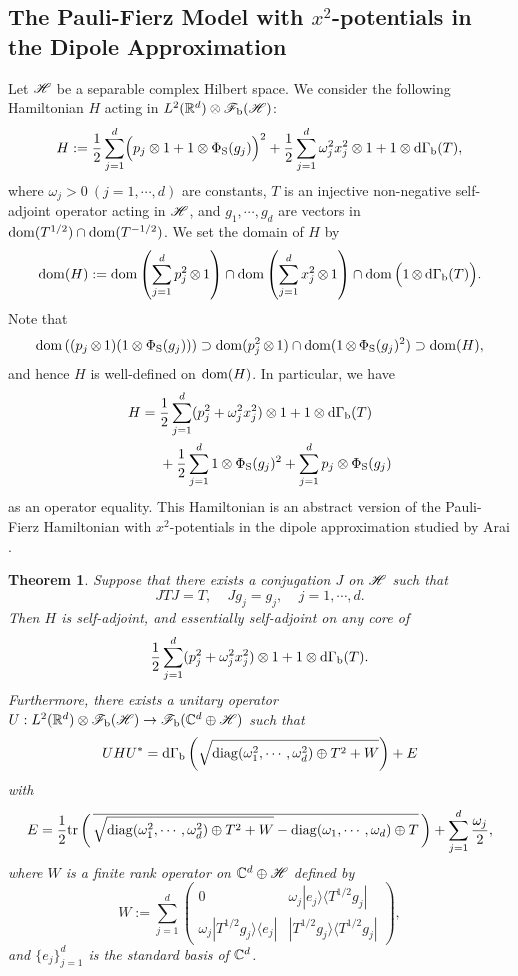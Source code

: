 \documentclass[12pt]{article}
\theoremstyle{plain}
\newtheorem{theorem}{Theorem}[section]
\numberwithin{equation}{section}
\theoremstyle{remark}
\begin{document}
\subsection{The Pauli-Fierz Model with $x^2$-potentials in the Dipole Approximation}\label{PFmodel}
Let $\mathscr{H}$ be a separable complex Hilbert space.
We consider the following Hamiltonian $H$ acting in $L^2(\mathbb{R}^d)\otimes\mathscr{F}_\mathrm{b}(\mathscr{H})$:
\[
H:=\frac{1}{2}\sum_{j=1}^{d}\Bigl(p_j\otimes 1+1\otimes\Phi_{\rm S}(g_j)\Bigr)^2 
+\frac{1}{2}\sum_{j=1}^d \omega_j^2x_j^2\otimes 1 +1\otimes\mathrm{d\Gamma_b}(T),
\]
where $\omega_j>0\ (j=1,\cdots, d)$ are constants, $T$ is an injective non-negative self-adjoint operator acting in $\mathscr{H}$,
and $g_1,\cdots,g_d$ are vectors in ${\rm dom}(T^{1/2})\cap{\rm dom}(T^{-1/2})$.
We set the domain of $H$ by
\begin{align}
 \mathop{\mathrm{dom}}(H) 
 := \mathop{\mathrm{dom}}\left(\sum_{j=1}^d p_j^2\mathop{\otimes}1\right) 
  \cap \mathop{\mathrm{dom}}\left(\sum_{j=1}^d x_j^2\mathop{\otimes} 1\right)
  \cap \mathop{\mathrm{dom}}\Big( 1\mathop{\otimes} \mathrm{d\Gamma_b}(T)\Big).  \label{dom of Hpf}
\end{align}
Note that
\begin{align*}
  \mathop{\mathrm{dom}}\left((p_j\mathop{\otimes} 1)(1\otimes \Phi_\mathrm{S}(g_j))\right) \supset \mathop{\mathrm{dom}}(p_j^2\mathop{\otimes}1)\cap\mathop{\mathrm{dom}}(1\mathop{\otimes}\Phi_\mathrm{S}(g_j)^2) \supset \mathop{\mathrm{dom}}(H),
\end{align*}
and hence $H$ is well-defined on $\mathop{\mathrm{dom}}(H)$.
In particular, we have
\begin{align}
H &= \frac{1}{2}\sum_{j=1}^d(p_j^2+\omega_j^2x_j^2)\otimes 1 + 1\otimes\mathrm{d\Gamma_b}(T)\notag\\
&~~~~+ \frac{1}{2}\sum_{j=1}^d1\otimes\Phi_\mathrm{S}(g_j)^2 + \sum_{j=1}^dp_j\otimes\Phi_\mathrm{S}(g_j)\label{gpfh}
\end{align}
as an operator equality.
This Hamiltonian is an abstract version of the Pauli-Fierz Hamiltonian with $x^2$-potentials in the dipole approximation studied by Arai \cite{A83}.

\begin{theorem}
Suppose that there exists a conjugation $J$ on $\mathscr{H}$ such that 
\[
JTJ=T,\ \ \ \ \ Jg_j=g_j,\ \ \ \ \ j=1,\cdots,d.
\]
Then $H$ is self-adjoint, and essentially self-adjoint on any core of
\[
\frac{1}{2}\sum_{j=1}^d(p_j^2+\omega_j^2x_j^2)\otimes 1 + 1\otimes\mathrm{d\Gamma_b}(T).
\]
Furthermore, there exists a unitary operator $U:L^2(\mathbb{R}^d)\otimes\mathscr{F}_\mathrm{b}(\mathscr{H})\to\mathscr{F}_\mathrm{b}(\mathbb{C}^d\oplus\mathscr{H})$ such that 
\[
UHU^*=\mathrm{d\Gamma_b}\left(\sqrt{{\rm diag}(\omega_1^2,\cdots,\omega_d^2)\oplus T^2 + W}\right)
+E
\]
with
\[
E=\frac{1}{2}\mathrm{tr}\left(\,\overline{\sqrt{{\rm diag}(\omega_1^2,\cdots,\omega_d^2)\oplus T^2 + W}-{\rm diag}(\omega_1,\cdots,\omega_d)\oplus T}\,\right)+\sum_{j=1}^d\frac{\omega_j}{2},
\]
where $W$ is a finite rank operator on $\mathbb{C}^d\oplus\mathscr{H}$ defined by
\[
W:=\sum_{j=1}^d
\begin{pmatrix}
0 & \omega_j|e_j\rangle\langle T^{1/2}g_j| \\
\omega_j |T^{1/2}g_j\rangle\langle e_j| &  |T^{1/2}g_j\rangle\langle T^{1/2}g_j|
\end{pmatrix},
\]
and $\{e_j\}_{j=1}^d$ is the standard basis of $\mathbb{C}^d$.
\end{theorem}
\end{document}

